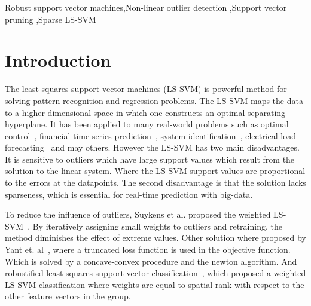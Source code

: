 \documentclass[preprint,12pt]{elsarticle}
\begin{document}
\begin{frontmatter}
\begin{abstract}
\end{abstract}

\begin{keyword}
	Robust support vector machines\sep Non-linear outlier detection \sep Support vector pruning \sep Sparse LS-SVM 
\end{keyword}
\end{frontmatter}


\newpage
\section{Introduction}

The least-squares support vector machines (LS-SVM) is powerful method for solving pattern recognition and regression problems. The LS-SVM maps the data to a higher dimensional space in which one constructs an optimal separating hyperplane. It has been applied to many real-world problems such as optimal control~\cite{suykens2001optimal}, financial time series prediction~\cite{van2001financial}, system identification~\cite{goethals2005identification}, electrical load forecasting~\cite{espinoza2006fixed} and may others. However the LS-SVM has two main disadvantages. It is sensitive to outliers which have large support values which result from the solution to the linear system. Where the LS-SVM support values are proportional to the errors at the datapoints. The second disadvantage is that the solution lacks sparseness, which is essential for real-time prediction with big-data.

To reduce the influence of outliers, Suykens et al. proposed the weighted LS-SVM~\cite{suykens2002weighted}. By iteratively assigning small weights to outliers and retraining, the method diminishes the effect of extreme values. Other solution where proposed by Yant et. al~\cite{yang2014robust}, where a truncated loss function is used in the objective function. Which is solved by a concave-convex procedure and the newton algorithm. And robustified least squares support vector classification~\cite{debruyne2009robustified}, which proposed a weighted LS-SVM classification where weights are equal to spatial rank with respect to the other feature vectors in the group.
\end{document}
